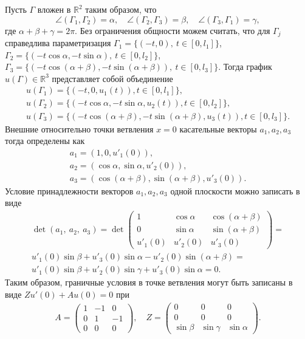 Пусть $\Gamma$ вложен в $\mathbb{R}^2$ таким образом, что 
$$
\angle( \Gamma_1, \Gamma_2) = \alpha, \quad
\angle( \Gamma_2, \Gamma_3) = \beta, \quad
\angle( \Gamma_3, \Gamma_1) = \gamma,
$$
где $\alpha + \beta + \gamma = 2 \pi$. Без ограничения общности можем считать, что для $\Gamma_j$ справедлива параметризация 
$\Gamma_1 = \{(-t , 0), \ t \in [0, l_1]\}$,
$\Gamma_2 = \{(-t \cos \alpha ,-t \sin \alpha ), \ t \in [0, l_2]\}$,
$\Gamma_3 = \{(-t\cos(\alpha+\beta) ,-t\sin(\alpha+\beta)), \ t \in [0, l_3]\}$.
Тогда график $u(\Gamma) \in \mathbb{R}^3$ представляет собой объединение 
\[
\begin{array}{ll}
u(\Gamma_1) = \{(-t , 0, u_1(t)), t \in [0, l_1]\}, \\
u(\Gamma_2) = \{(-t \cos \alpha ,-t \sin \alpha, u_2(t) ), t \in [0, l_2]\}, \\
u(\Gamma_3) =\{(-t\cos(\alpha+\beta) ,-t\sin(\alpha+\beta), u_3(t)), t \in [0, l_3]\}.
\end{array}
\]
Внешние относительно точки ветвления  $x=0$ касательные векторы $a_1, a_2, a_3$ тогда определены как
\[
\begin{array}{ll}
a_1 = (1 , 0, u'_1(0)), \\
a_2 = (\cos \alpha , \sin \alpha, u'_2(0) ),\\
a_3 =(\cos(\alpha+\beta) ,\sin(\alpha+\beta), u'_3(0)).
\end{array}
\]
Условие принадлежности векторов $a_1, a_2, a_3$ одной плоскости можно записать в виде 
\begin{multline*}
\det (a_1, \ a_2, \ a_3) = \det 
\begin{pmatrix}
1 		&	\cos \alpha 	& 	\cos(\alpha+\beta) 	\\
0		&	\sin \alpha		&	\sin(\alpha+\beta)	\\
u'_1(0)	&	u'_2(0) 		&	u'_3(0)
\end{pmatrix} = \\ u'_1(0) \sin \beta + u'_3(0) \sin \alpha - u'_2(0) \sin (\alpha+\beta) = \\
 u'_1(0) \sin \beta + u'_2(0) \sin \gamma + u'_3(0) \sin \alpha = 0.
\end{multline*}
Таким образом, граничные условия в точке ветвления могут быть записаны в виде $Z u'(0) + A u(0) =0$ при
\[
\begin{array}{cc}
A = \begin{pmatrix}
1		& -1 			& 0 \\ 
0 		& 1		  	& -1 \\ 
0		& 0			& 0
\end{pmatrix} , \quad
Z = \begin{pmatrix}
0			& 0				& 0 \\
0			& 0				& 0 \\
\sin \beta		& \sin \gamma		& \sin \alpha
\end{pmatrix} .
\end{array}
\]
